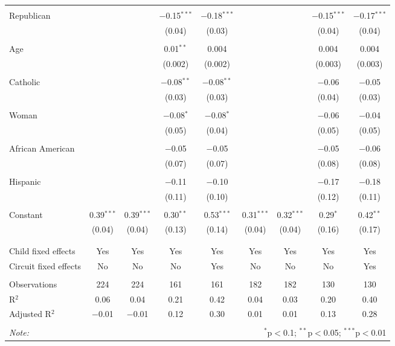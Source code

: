 \begin{table}[h]
\begin{adjustbox}{width=1\textwidth}
\begin{tabular}{@{\extracolsep{5pt}}lcccccccc}
  & & & & & & & & \\ 
 Republican &  &  & $-$0.15$^{***}$ & $-$0.18$^{***}$ &  &  & $-$0.15$^{***}$ & $-$0.17$^{***}$ \\ 
  &  &  & (0.04) & (0.03) &  &  & (0.04) & (0.04) \\ 
  & & & & & & & & \\ 
 Age &  &  & 0.01$^{**}$ & 0.004 &  &  & 0.004 & 0.004 \\ 
  &  &  & (0.002) & (0.002) &  &  & (0.003) & (0.003) \\ 
  & & & & & & & & \\ 
 Catholic &  &  & $-$0.08$^{**}$ & $-$0.08$^{**}$ &  &  & $-$0.06 & $-$0.05 \\ 
  &  &  & (0.03) & (0.03) &  &  & (0.04) & (0.03) \\ 
  & & & & & & & & \\ 
 Woman &  &  & $-$0.08$^{*}$ & $-$0.08$^{*}$ &  &  & $-$0.06 & $-$0.04 \\ 
  &  &  & (0.05) & (0.04) &  &  & (0.05) & (0.05) \\ 
  & & & & & & & & \\ 
 African American &  &  & $-$0.05 & $-$0.05 &  &  & $-$0.05 & $-$0.06 \\ 
  &  &  & (0.07) & (0.07) &  &  & (0.08) & (0.08) \\ 
  & & & & & & & & \\ 
 Hispanic &  &  & $-$0.11 & $-$0.10 &  &  & $-$0.17 & $-$0.18 \\ 
  &  &  & (0.11) & (0.10) &  &  & (0.12) & (0.11) \\ 
  & & & & & & & & \\ 
 Constant & 0.39$^{***}$ & 0.39$^{***}$ & 0.30$^{**}$ & 0.53$^{***}$ & 0.31$^{***}$ & 0.32$^{***}$ & 0.29$^{*}$ & 0.42$^{**}$ \\ 
  & (0.04) & (0.04) & (0.13) & (0.14) & (0.04) & (0.04) & (0.16) & (0.17) \\ 
  & & & & & & & & \\ 
\hline \\[-1.8ex] 
Child fixed effects & Yes & Yes & Yes & Yes & Yes & Yes & Yes & Yes \\ 
Circuit fixed effects & No & No & No & Yes  & No & No & No & Yes \\ 
\hline \\[-1.8ex] 
Observations & 224 & 224 & 161 & 161 & 182 & 182 & 130 & 130 \\ 
R$^{2}$ & 0.06 & 0.04 & 0.21 & 0.42 & 0.04 & 0.03 & 0.20 & 0.40 \\ 
Adjusted R$^{2}$ & $-$0.01 & $-$0.01 & 0.12 & 0.30 & 0.01 & 0.01 & 0.13 & 0.28 \\ 
\hline 
\hline \\[-1.8ex] 
\textit{Note:}  & \multicolumn{8}{r}{$^{*}$p$<$0.1; $^{**}$p$<$0.05; $^{***}$p$<$0.01} \\ 
\end{tabular}\end{adjustbox}
\end{table} 
